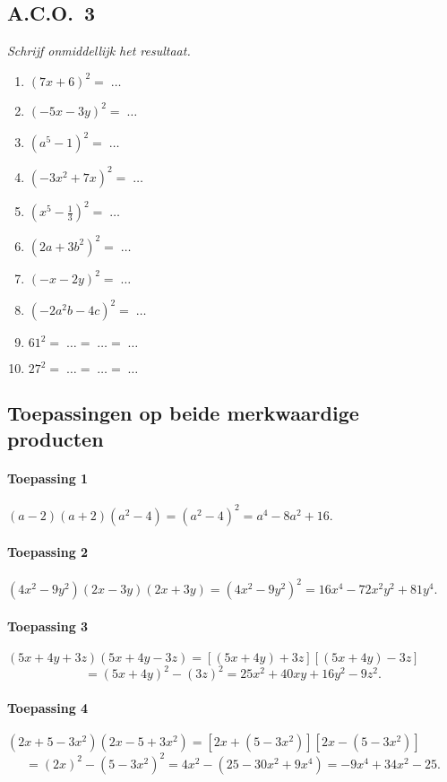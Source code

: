 \documentclass[a4paper,12pt]{article}
\begin{document}
\subsection*{A.C.O.\ 3}
\emph{Schrijf onmiddellijk het resultaat.}
\begin{multicols}{2}
  \begin{enumerate}
  \item \((7x+6)^2=\;\ldots\)
  \item \(({-}5x-3y)^2=\;\ldots\)
  \item \((a^5-1)^2=\;\ldots\)
  \item \(({-}3x^2+7x)^2=\;\ldots\)
  \item \((x^5-\tfrac{1}{3})^2=\;\ldots\)
  \item \((2a+3b^2)^2=\;\ldots\)
  \item \(({-}x-2y)^2=\;\ldots\)
  \item \(({-}2a^2b-4c)^2=\;\ldots\)
  \item \(61^2=\;\ldots=\;\ldots=\;\ldots\)
  \item \(27^2=\;\ldots=\;\ldots=\;\ldots\)
  \end{enumerate}
\end{multicols}
\subsection*{Toepassingen op beide merkwaardige producten}
\paragraph*{Toepassing 1}
\((a-2)(a+2)(a^2-4)=(a^2-4)^2=a^4-8a^2+16.\)

\paragraph*{Toepassing 2}
\((4x^2-9y^2)(2x-3y)(2x+3y)=(4x^2-9y^2)^2=16x^4-72x^2y^2+81y^4.\)

\paragraph*{Toepassing 3}
\((5x+4y+3z)(5x+4y-3z)=[(5x+4y)+3z][(5x+4y)-3z]\)
\[
=(5x+4y)^2-(3z)^2=25x^2+40xy+16y^2-9z^2.
\]

\paragraph*{Toepassing 4}
\((2x+5-3x^2)(2x-5+3x^2)=[2x+(5-3x^2)][2x-(5-3x^2)]\)
\[
=(2x)^2-(5-3x^2)^2=4x^2-(25-30x^2+9x^4)=-9x^4+34x^2-25.
\]
\end{document}
